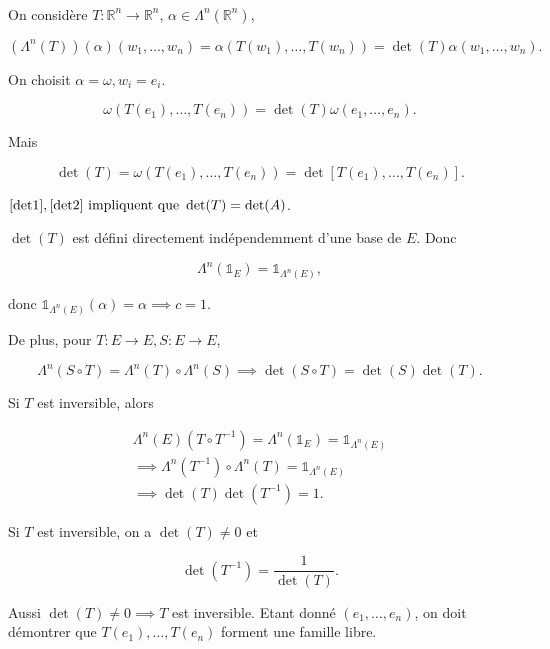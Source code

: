 \documentclass[french]{article}
\theoremstyle{definition}
\theoremstyle{remark}
\begin{document}
\

On considère \(T : \mathbb{R}^n \to \mathbb{R}^n\), \( \alpha \in \Lambda ^{n}(\mathbb{R}^n)\),

\[(\Lambda ^{n}(T))(\alpha) (w_1, \dots, w_n) = \alpha(T (w_1), \dots, T(w_n)) = \operatorname{det}(T) \alpha(w_1, \dots, w_n).\]

On choisit \(\alpha = \omega, w_i = e_i\).

\begin{equation}
  \omega (T(e_1), \dots, T(e_n)) = \operatorname{det}(T)\omega(e_1, \dots, e_n). \label{det1}
\end{equation}

Mais

\begin{equation}
  \operatorname{det}(T) = \omega(T(e_1), \dots, T(e_n)) = \operatorname{det}[ T(e_1), \dots, T(e_n)]. \label{det2}
\end{equation}

\(\ref{det1}, \ref{det2} \text{ impliquent que }  \operatorname{det}(T) = \operatorname{det}(A)\).

\(\operatorname{det}(T)\) est défini directement indépendemment d'une base de \(E\). Donc

\[\Lambda ^{n}(\mathds{1}_{E}) = \mathds{1}_{\Lambda ^{n}(E)},\]

donc \(\mathds{1}_{\Lambda ^{n}(E)}(\alpha) =\alpha \implies c=1\).

De plus, pour \(T : E \to E, S : E \to E\),

\[\Lambda ^{n}(S \circ T) = \Lambda ^{n}(T) \circ \Lambda ^{n}(S) \implies \operatorname{det}(S \circ T) = \operatorname{det}(S) \operatorname{det}(T).\]

Si \(T\) est inversible, alors

\begin{gather*}
  \Lambda ^{n}(E)(T \circ T ^{-1}) = \Lambda ^{n}(\mathds{1}_{E}) = \mathds{1}_{\Lambda ^{n}(E)} \\
  \implies \Lambda ^{n}(T ^{-1}) \circ \Lambda ^{n}(T) = \mathds{1}_{\Lambda ^{n}(E)} \\
  \implies \operatorname{det}(T) \operatorname{det}(T ^{-1}) = 1.
\end{gather*}

Si \(T\) est inversible, on a \(\operatorname{det}(T) \neq 0\) et

\[\operatorname{det}(T ^{-1}) = \frac{1}{\operatorname{det}(T)}.\]

Aussi \(\operatorname{det}(T) \neq 0 \implies T\) est inversible. Etant donné \((e_1, \dots, e_n)\), on doit démontrer que \(T(e_1), \dots, T(e_n)\) forment une famille libre.
\end{document}
